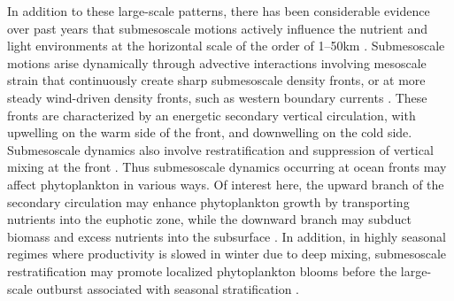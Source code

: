 In addition to these large-scale patterns, there has been considerable evidence over past years that submesoscale motions actively influence the nutrient and light environments at the horizontal scale of the order of 1--50km \citep[see reviews by][]{levy_2012, mahadevan_2016, levy_2018}.
Submesoscale motions arise dynamically through advective interactions involving mesoscale strain that continuously create sharp submesoscale density fronts, or at more steady wind-driven density fronts, such as western boundary currents \citep{thomas_2008, mcwilliams_2016, mahadevan_2020}.
These fronts are characterized by an energetic secondary vertical circulation, with upwelling on the warm side of the front, and downwelling on the cold side.
Submesoscale dynamics also involve restratification and suppression of vertical mixing at the front \citep{thomas_2008a}.
Thus submesoscale dynamics occurring at ocean fronts may affect phytoplankton in various ways.
Of interest here, the upward branch of the secondary circulation may enhance phytoplankton growth by transporting nutrients into the euphotic zone, while the downward branch may subduct biomass and excess nutrients into the subsurface \citep{calil_2011, omand_2015, hauschildt_2021}.
In addition, in highly seasonal regimes where productivity is slowed in winter due to deep mixing, submesoscale restratification may promote localized phytoplankton blooms before the large-scale outburst associated with seasonal stratification \citep{mahadevan_2012}.

